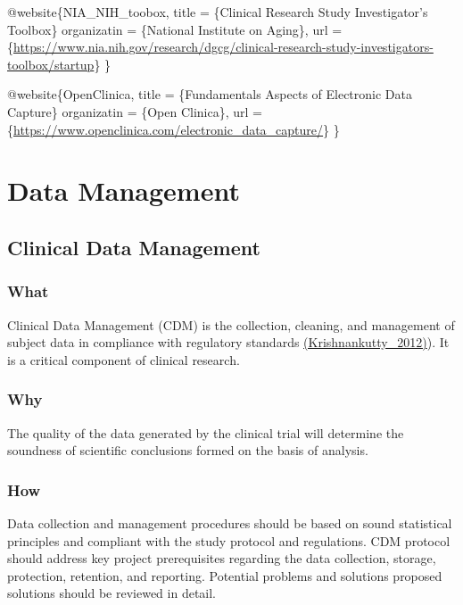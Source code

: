 \documentclass[]{book}
\theoremstyle{definition}
\theoremstyle{definition}
\theoremstyle{definition}
\theoremstyle{remark}
\begin{document}
@website\{NIA\_NIH\_toobox, title = \{Clinical Research Study
Investigator's Toolbox\} organizatin = \{National Institute on Aging\},
url =
\{\url{https://www.nia.nih.gov/research/dgcg/clinical-research-study-investigators-toolbox/startup}\}
\}

@website\{OpenClinica, title = \{Fundamentals Aspects of Electronic Data
Capture\} organizatin = \{Open Clinica\}, url =
\{\url{https://www.openclinica.com/electronic_data_capture/}\} \}

\chapter{Data Management}\label{data-management}

\section{Clinical Data Management}\label{clinical-data-management}

\subsection{What}\label{what-19}

Clinical Data Management (CDM) is the collection, cleaning, and
management of subject data in compliance with regulatory standards
\href{http://dx.doi.org/10.4103/0253-7613.93842}{(Krishnankutty\_2012)}).
It is a critical component of clinical research.

\subsection{Why}\label{why-19}

The quality of the data generated by the clinical trial will determine
the soundness of scientific conclusions formed on the basis of analysis.

\subsection{How}\label{how-19}

Data collection and management procedures should be based on sound
statistical principles and compliant with the study protocol and
regulations. CDM protocol should address key project prerequisites
regarding the data collection, storage, protection, retention, and
reporting. Potential problems and solutions proposed solutions should be
reviewed in detail.
\end{document}
